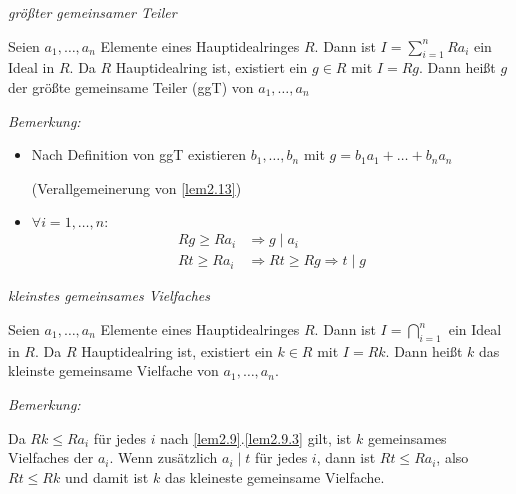 \begin{mydef} \textit{größter gemeinsamer Teiler}

    Seien $a_1, \ldots, a_n$ Elemente eines Hauptidealringes $R$. Dann ist $I = \sum\limits_{i=1}^n Ra_i$ ein Ideal in $R$.
    Da $R$ Hauptidealring ist, existiert ein $g \in R$ mit $I = Rg$. Dann heißt $g$ der größte gemeinsame Teiler (ggT) von $a_1, \ldots, a_n$
\end{mydef}


\textit{Bemerkung:}
\begin{itemize}
    \item Nach Definition von ggT existieren $b_1, \ldots, b_n$ mit $g = b_1 a_1 + \ldots + b_n a_n$
        
        \hfill (Verallgemeinerung von \ref{lem2.13})
    \item $\forall i=1, \ldots, n:$
        \begin{align*}
        Rg \geq Ra_i & \Rightarrow g \mid a_i\\
        Rt \geq Ra_i & \Rightarrow Rt \geq Rg \Rightarrow t\mid g
        \end{align*}
\end{itemize}


\begin{mydef} \textit{kleinstes gemeinsames Vielfaches}

    Seien $a_1, \ldots, a_n$ Elemente eines Hauptidealringes $R$. Dann ist $I=\bigcap\limits_{i=1}^n$ ein Ideal in $R$.
    Da $R$ Hauptidealring ist, existiert ein $k \in R$ mit $I = Rk$. Dann heißt $k$ das kleinste gemeinsame Vielfache von $a_1, \ldots, a_n$.
\end{mydef}


\textit{Bemerkung:}

    Da $Rk \leq Ra_i$ für jedes $i$ nach \ref{lem2.9}.\ref{lem2.9.3} gilt, ist $k$ gemeinsames Vielfaches der $a_i$.
    Wenn zusätzlich $a_i \mid t$ für jedes $i$, dann ist $Rt \leq Ra_i$, also $Rt \leq Rk$ und damit ist $k$ das kleineste gemeinsame Vielfache.\\

